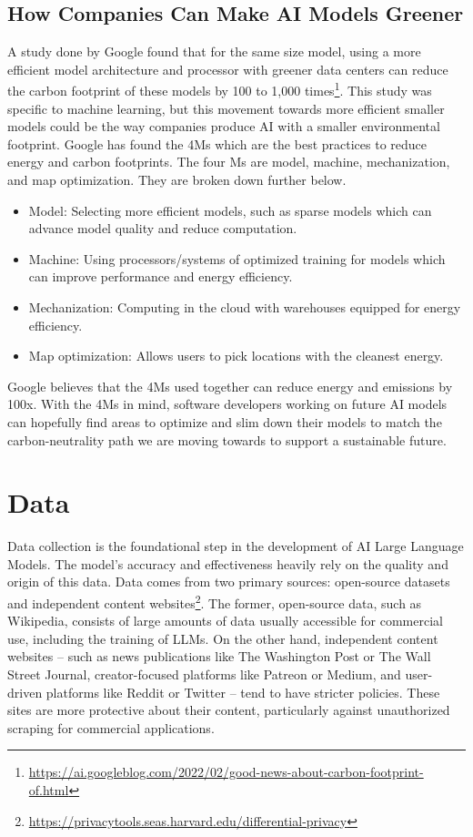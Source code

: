 \documentclass[
]{book}
\providecommand{\tightlist}{%
  \setlength{\itemsep}{0pt}\setlength{\parskip}{0pt}}
\begin{document}
\hypertarget{how-companies-can-make-ai-models-greener}{%
\section{How Companies Can Make AI Models Greener}\label{how-companies-can-make-ai-models-greener}}

A study done by Google found that for the same size model, using a more efficient model architecture and processor with greener data centers can reduce the carbon footprint of these models by 100 to 1,000 times\footnote{\url{https://ai.googleblog.com/2022/02/good-news-about-carbon-footprint-of.html}}. This study was specific to machine learning, but this movement towards more efficient smaller models could be the way companies produce AI with a smaller environmental footprint. Google has found the 4Ms which are the best practices to reduce energy and carbon footprints. The four Ms are model, machine, mechanization, and map optimization. They are broken down further below.

\begin{itemize}
\tightlist
\item
  Model: Selecting more efficient models, such as sparse models which can advance model quality and reduce computation.
\item
  Machine: Using processors/systems of optimized training for models which can improve performance and energy efficiency.
\item
  Mechanization: Computing in the cloud with warehouses equipped for energy efficiency.
\item
  Map optimization: Allows users to pick locations with the cleanest energy.
\end{itemize}

Google believes that the 4Ms used together can reduce energy and emissions by 100x. With the 4Ms in mind, software developers working on future AI models can hopefully find areas to optimize and slim down their models to match the carbon-neutrality path we are moving towards to support a sustainable future.

\hypertarget{data}{%
\chapter{Data}\label{data}}

Data collection is the foundational step in the development of AI Large Language Models. The model's accuracy and effectiveness heavily rely on the quality and origin of this data. Data comes from two primary sources: open-source datasets and independent content websites\footnote{\url{https://privacytools.seas.harvard.edu/differential-privacy}}. The former, open-source data, such as Wikipedia, consists of large amounts of data usually accessible for commercial use, including the training of LLMs. On the other hand, independent content websites -- such as news publications like The Washington Post or The Wall Street Journal, creator-focused platforms like Patreon or Medium, and user-driven platforms like Reddit or Twitter -- tend to have stricter policies. These sites are more protective about their content, particularly against unauthorized scraping for commercial applications.
\end{document}
